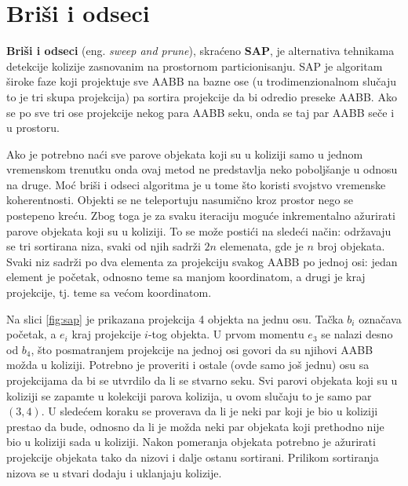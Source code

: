\documentclass[12pt,oneside]{memoir}
\begin{document}
\section{Briši i odseci}
\label{subsec:sap}

\textbf{Briši i odseci} (eng. {\em sweep and prune}), skraćeno \textbf{SAP}, je alternativa tehnikama detekcije kolizije 
zasnovanim na prostornom particionisanju.
SAP je algoritam široke faze koji projektuje sve AABB
na bazne ose (u trodimenzionalnom slučaju to je tri skupa projekcija) pa sortira projekcije da bi odredio preseke AABB.
Ako se po sve tri ose projekcije nekog para AABB seku, onda se taj par AABB seče i u prostoru.

Ako je potrebno naći sve parove objekata koji su u koliziji samo u jednom vremenskom trenutku onda ovaj metod ne predstavlja neko poboljšanje u odnosu na druge.
Moć briši i odseci algoritma je u tome što koristi svojstvo vremenske koherentnosti.
Objekti se ne teleportuju nasumično kroz prostor nego se postepeno kreću. 
Zbog toga je za svaku iteraciju moguće inkrementalno ažurirati parove objekata koji su u koliziji.
To se može postići na sledeći način: održavaju se tri sortirana niza, svaki od njih sadrži $2n$ elemenata, gde je $n$ broj objekata.
Svaki niz sadrži po dva elementa za projekciju svakog AABB po jednoj osi: jedan element je početak,
odnosno teme sa manjom koordinatom, a drugi je kraj projekcije, tj. teme sa većom koordinatom. 

Na slici \ref{fig:sap} je prikazana projekcija 4 objekta na jednu osu. 
Tačka $b_i$ označava početak, a $e_i$ kraj projekcije $i$-tog objekta.
U prvom momentu $e_3$ se nalazi desno od $b_4$, što posmatranjem projekcije na jednoj osi govori da su njihovi AABB možda u koliziji.
Potrebno je proveriti i ostale (ovde samo još jednu) osu sa projekcijama da bi se utvrdilo da li se stvarno seku.
Svi parovi objekata koji su u koliziji se zapamte u kolekciji parova kolizija, u ovom slučaju to je samo par $(3, 4)$.
U sledećem koraku se proverava da li je neki par koji je bio u koliziji prestao da bude, 
odnosno da li je možda neki par objekata koji prethodno nije bio u koliziji sada u koliziji.
Nakon pomeranja objekata potrebno je ažurirati projekcije objekata tako da nizovi i dalje ostanu sortirani.
Prilikom sortiranja nizova se u stvari dodaju i uklanjaju kolizije.
\end{document}
